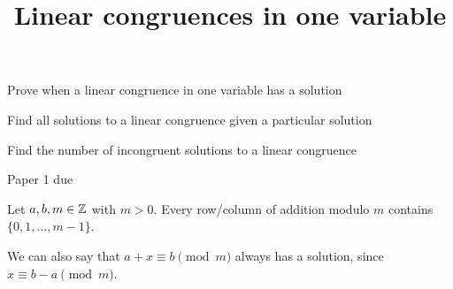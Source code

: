 \documentclass{ximera}
\title{Linear congruences in one variable}
\begin{document}
\begin{abstract}
\end{abstract}
\maketitle

\begin{obj}
	\item Prove when a linear congruence in one variable has a solution
	\item Find all solutions to a linear congruence given a particular solution
	\item Find the number of incongruent solutions to a linear congruence
\end{obj}


	\begin{pre} 
        \item Paper 1 due
	\end{pre}




\begin{remark}\label{rem:add-inverse}
	Let $a,b,m\in\mathbb Z$ with $m>0$. Every row/column of addition modulo $m$ contains $\{0,1,\dots,m-1\}$. 

	We can also say that $a+x\equiv b\pmod m$ always has a solution, since $x\equiv b-a\pmod m$.
\end{remark}
\end{document}
